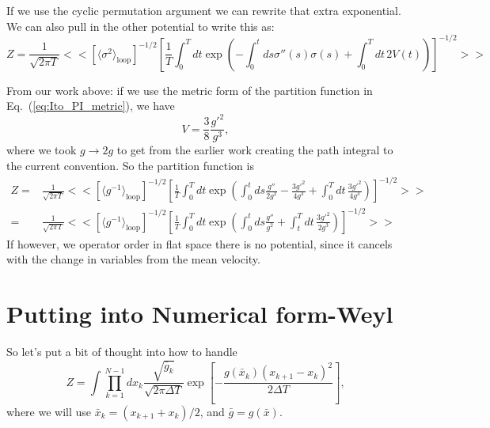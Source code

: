 If we use the cyclic permutation argument we can rewrite that extra exponential.  We can also pull in the other potential to write this as:
\begin{equation}
Z = \frac{1}{\sqrt{2\pi T}}\bigg<\bigg< [\langle \sigma^2\rangle_{\text{loop}}]^{-1/2}\left[\frac{1}{T}\int_0^T dt \exp\left(-\int_{0}^tds \sigma''(s) \sigma(s) + \int_0^T dt\, 2V(t)\right)\right]^{-1/2}\bigg>\bigg>
\end{equation}

From our work above: if we use the metric form of the partition function in Eq.~(\ref{eq:Ito_PI_metric}), we have 
\begin{equation}
V = \frac{3}{8}\frac{g'^2}{g^3},
\end{equation}
where we took $g\rightarrow 2g$ to get from the earlier work creating the path integral to the current convention.  
So the partition function is 
\begin{align}
Z =& \frac{1}{\sqrt{2\pi T}}\bigg<\bigg< [\langle g^{-1}\rangle_{\text{loop}}]^{-1/2}\left[\frac{1}{T}\int_0^T dt \exp\left(\int_{0}^tds \frac{g''}{2g^2}-\frac{3g'^2}{4g^3} + \int_0^T dt\, \frac{3 g'^2}{4g^3}\right)\right]^{-1/2}\bigg>\bigg>\\
=& \frac{1}{\sqrt{2\pi T}}\bigg<\bigg< [\langle g^{-1}\rangle_{\text{loop}}]^{-1/2}\left[\frac{1}{T}\int_0^T dt \exp\left(\int_{0}^tds \frac{g''}{g^2}+ \int_t^T dt\, \frac{3 g'^2}{2g^3}\right)\right]^{-1/2}\bigg>\bigg>
\end{align}
If however, we operator order in flat space there is no potential, since it cancels with the change in variables from the mean velocity.  


\section{Putting into Numerical form-Weyl} 

So let's put a bit of thought into how to handle 
\begin{equation}
Z = \int \prod_{k=1}^{N-1}dx_k \frac{\sqrt{\bar{g}_k}}{\sqrt{2\pi\Delta T}} \exp\left[- \frac{g(\bar{x}_k)(x_{k+1}-x_k)^2}{2\Delta T}\right],
\end{equation}
where we will use $\bar{x}_k = (x_{k+1}+x_k)/2$, and $\bar{g} = g(\bar{x})$.  
